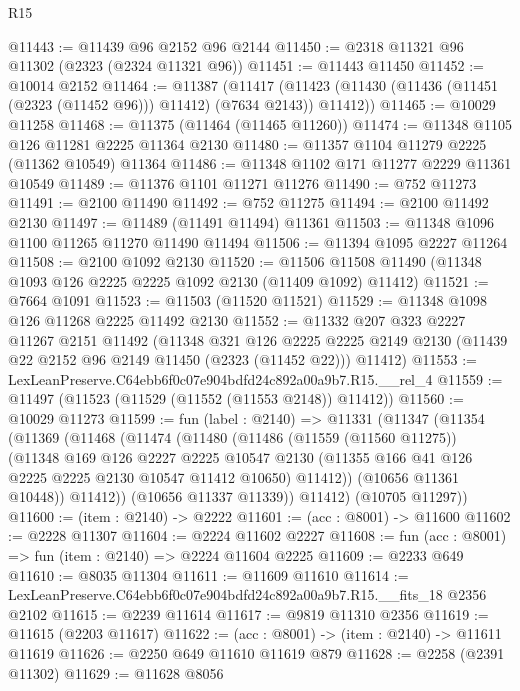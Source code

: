 \begin{lexlean}{R15}
\begin{coremodule}
@11443 := @11439 @96 @2152 @96 @2144
@11450 := @2318 @11321 @96 @11302 (@2323 (@2324 @11321 @96))
@11451 := @11443 @11450
@11452 := @10014 @2152
@11464 := @11387
    (@11417 (@11423 (@11430 (@11436 (@11451 (@2323 (@11452 @96))) @11412) (@7634 @2143)) @11412))
@11465 := @10029 @11258
@11468 := @11375 (@11464 (@11465 @11260))
@11474 := @11348 @1105 @126 @11281 @2225 @11364 @2130
@11480 := @11357 @1104 @11279 @2225 (@11362 @10549) @11364
@11486 := @11348 @1102 @171 @11277 @2229 @11361 @10549
@11489 := @11376 @1101 @11271 @11276
@11490 := @752 @11273
@11491 := @2100 @11490
@11492 := @752 @11275
@11494 := @2100 @11492 @2130
@11497 := @11489 (@11491 @11494) @11361
@11503 := @11348 @1096 @1100 @11265 @11270 @11490 @11494
@11506 := @11394 @1095 @2227 @11264
@11508 := @2100 @1092 @2130
@11520 := @11506 @11508 @11490 (@11348 @1093 @126 @2225 @2225 @1092 @2130 (@11409 @1092) @11412)
@11521 := @7664 @1091
@11523 := @11503 (@11520 @11521)
@11529 := @11348 @1098 @126 @11268 @2225 @11492 @2130
@11552 := @11332
    @207
    @323
    @2227
    @11267
    @2151
    @11492
    (@11348
      @321
      @126
      @2225
      @2225
      @2149
      @2130
      (@11439 @22 @2152 @96 @2149 @11450 (@2323 (@11452 @22)))
      @11412)
@11553 := LexLeanPreserve.C64ebb6f0c07e904bdfd24c892a00a9b7.R15.__rel_4
@11559 := @11497 (@11523 (@11529 (@11552 (@11553 @2148)) @11412))
@11560 := @10029 @11273
@11599 := fun (label : @2140) =>
  @11331
    (@11347
      (@11354
        (@11369
          (@11468
            (@11474
              (@11480
                (@11486
                  (@11559 (@11560 @11275))
                  (@11348
                    @169
                    @126
                    @2227
                    @2225
                    @10547
                    @2130
                    (@11355 @166 @41 @126 @2225 @2225 @2130 @10547 @11412 @10650)
                    @11412))
                (@10656 @11361 @10448))
              @11412))
          (@10656 @11337 @11339))
        @11412)
      (@10705 @11297))
@11600 := (item : @2140) -> @2222
@11601 := (acc : @8001) -> @11600
@11602 := @2228 @11307
@11604 := @2224 @11602 @2227
@11608 := fun (acc : @8001) => fun (item : @2140) => @2224 @11604 @2225
@11609 := @2233 @649
@11610 := @8035 @11304
@11611 := @11609 @11610
@11614 := LexLeanPreserve.C64ebb6f0c07e904bdfd24c892a00a9b7.R15.__fits_18 @2356 @2102
@11615 := @2239 @11614
@11617 := @9819 @11310 @2356
@11619 := @11615 (@2203 @11617)
@11622 := (acc : @8001) -> (item : @2140) -> @11611 @11619
@11626 := @2250 @649 @11610 @11619 @879
@11628 := @2258 (@2391 @11302)
@11629 := @11628 @8056

\end{coremodule}
\end{lexlean}
